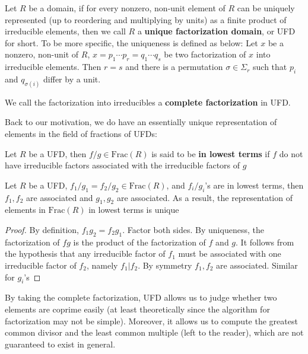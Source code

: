 \documentclass{note-eng}
\begin{document}
\begin{definition}
    Let $R$ be a domain, if for every nonzero, non-unit element of $R$ can be uniquely represented (up to reordering and multiplying by units) as a finite product of irreducible elements, then we call $R$ a \textbf{unique factorization domain}, or UFD for short. To be more specific, the uniqueness is defined as below: Let $x$ be a nonzero, non-unit of $R$, $x = p_1 \cdots p_r = q_1 \cdots q_s$ be two factorization of $x$ into irreducible elements. Then $r = s$ and there is a permutation $\sigma \in \Sigma_r$ such that $p_i$ and $q_{\sigma(i)}$ differ by a unit.

    We call the factorization into irreducibles a \textbf{complete factorization} in UFD.
\end{definition}

Back to our motivation, we do have an essentially unique representation of elements in the field of fractions of UFDs:

\begin{definition}
    Let $R$ be a UFD, then $f / g \in \mathrm{Frac}(R)$ is said to be \textbf{in lowest terms} if $f$ do not have irreducible factors associated with the irreducible factors of $g$
\end{definition}

\begin{proposition}
    Let $R$ be a UFD, $f_1 / g_1 = f_2 / g_2 \in \mathrm{Frac}(R)$, and $f_i / g_i$'s are in lowest terms, then $f_1, f_2$ are associated and $g_1, g_2$ are associated. As a result, the representation of elements in $\mathrm{Frac}(R)$ in lowest terms is unique
\end{proposition}

\begin{proof}
    By definition, $f_1g_2 = f_2g_1$. Factor both sides. By uniqueness, the factorization of $fg$ is the product of the factorization of $f$ and $g$. It follows from the hypothesis that any irreducible factor of $f_1$ must be associated with one irreducible factor of $f_2$, namely $f_1 | f_2$. By symmetry $f_1, f_2$ are associated. Similar for $g_i$'s
\end{proof}

By taking the complete factorization, UFD allows us to judge whether two elements are coprime easily (at least theoretically since the algorithm for factorization may not be simple). Moreover, it allows us to compute the greatest common divisor and the least common multiple (left to the reader), which are not guaranteed to exist in general.
\end{document}
